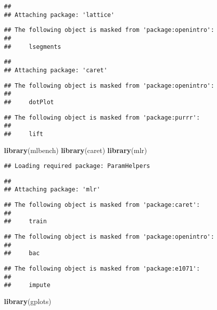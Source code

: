 \documentclass[]{article}
\newenvironment{Shaded}{\begin{snugshade}}{\end{snugshade}}
\newcommand{\KeywordTok}[1]{\textcolor[rgb]{0.13,0.29,0.53}{\textbf{#1}}}
\newcommand{\NormalTok}[1]{#1}
\begin{document}
\begin{verbatim}
## 
## Attaching package: 'lattice'
\end{verbatim}

\begin{verbatim}
## The following object is masked from 'package:openintro':
## 
##     lsegments
\end{verbatim}

\begin{verbatim}
## 
## Attaching package: 'caret'
\end{verbatim}

\begin{verbatim}
## The following object is masked from 'package:openintro':
## 
##     dotPlot
\end{verbatim}

\begin{verbatim}
## The following object is masked from 'package:purrr':
## 
##     lift
\end{verbatim}

\begin{Shaded}
\begin{Highlighting}[]
\KeywordTok{library}\NormalTok{(mlbench)}
\KeywordTok{library}\NormalTok{(caret)}
\KeywordTok{library}\NormalTok{(mlr)}
\end{Highlighting}
\end{Shaded}

\begin{verbatim}
## Loading required package: ParamHelpers
\end{verbatim}

\begin{verbatim}
## 
## Attaching package: 'mlr'
\end{verbatim}

\begin{verbatim}
## The following object is masked from 'package:caret':
## 
##     train
\end{verbatim}

\begin{verbatim}
## The following object is masked from 'package:openintro':
## 
##     bac
\end{verbatim}

\begin{verbatim}
## The following object is masked from 'package:e1071':
## 
##     impute
\end{verbatim}

\begin{Shaded}
\begin{Highlighting}[]
\KeywordTok{library}\NormalTok{(gplots)}
\end{Highlighting}
\end{Shaded}
\end{document}
